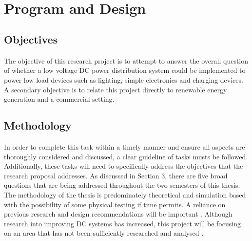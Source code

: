 \section{Program and Design}  


\subsection{Objectives}

\paragraph{}
The objective of this research project is to attempt to answer the overall question of whether a low voltage DC power distribution system could be implemented to power low load devices such as lighting, simple electronics and charging devices. A secondary objective is to relate this project directly to renewable energy generation and a commercial setting.

\subsection{Methodology}

\paragraph{}
In order to complete this task within a timely manner and ensure all aspects are thoroughly considered and discussed, a clear guideline of tasks musts be followed. Additionally, these tasks will need to specifically address the objectives that the research proposal addresses. As discussed in Section 3, there are five broad questions that are being addressed throughout the two semesters of this thesis. The methodology of the thesis is predominately theoretical and simulation based with the possibility of some physical testing if time permits. A reliance on previous research and design recommendations will be important \cite{Amin2011}. Although research into improving DC systems has increased, this project will be focusing on an area that has not been sufficiently researched and analysed \cite{Pellis1997}.   

